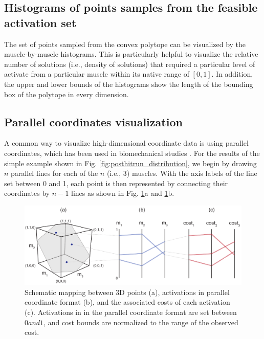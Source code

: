 \subsection*{Histograms of points samples from the feasible activation set}
The set of points sampled from the convex polytope can be visualized by the muscle-by-muscle histograms.  This is particularly  helpful to  visualize the relative number of solutions (i.e., density of solutions) that required a particular level of activate from a particular muscle within its native range of $[0,1]$. In addition, the upper and lower bounds of the histograms show the length of the bounding box of the polytope in every dimension. 

\subsection*{Parallel coordinates visualization}
A common way to visualize high-dimensional coordinate data is using parallel coordinates, which has been used in biomechanical studies \cite{bachynskyi2013biomechanical, krekel2010visual}.
For the results of the simple example shown in Fig. \ref{fig:posthitrun_distribution}, we begin by drawing $n$ parallel lines for each of the $n$ (i.e., 3) muscles.
With the axis labels of the line set between 0 and 1, each point is then represented by connecting their coordinates by $n-1$ lines as shown in Fig. \ref{fig:points_to_parcoords_mapping}a and \ref{fig:points_to_parcoords_mapping}b. 


\begin{figure}[ht]
  \centering
  \includegraphics[width=1.0\textwidth]{sections/figs/3d_points_to_parcoords.pdf}
  \caption{Schematic mapping between 3D points (a), activations in parallel coordinate format (b), and the associated costs of each activation (c).
Activations in in the parallel coordinate format are set between $0 and 1$, and cost bounds are normalized to the range of the observed cost.}
  \label{fig:points_to_parcoords_mapping}
\end{figure}


